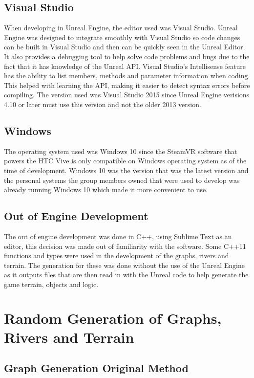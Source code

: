\subsection{Visual Studio}
When developing in Unreal Engine, the editor used was Visual Studio. Unreal Engine was designed to integrate smoothly with Visual Studio so code changes can be built in Visual Studio and then can be quickly seen in the Unreal Editor. It also provides a debugging tool to help solve code problems and bugs due to the fact that it has knowledge of the Unreal API. Visual Studio's Intellisense feature has the ability to list members, methods and parameter information when coding. This helped with learning the API, making it easier to detect syntax errors before compiling. The version used was Visual Studio 2015 since Unreal Engine verisions 4.10 or later must use this version and not the older 2013 version.

\subsection{Windows}
The operating system used was Windows 10 since the SteamVR software that powers the HTC Vive is only compatible on Windows operating system as of the time of development. Windows 10 was the version that was the latest version and the personal systems the group members owned that were used to develop was already running Windows 10 which made it more convenient to use.

\subsection{Out of Engine Development}
The out of engine development was done in C++, using Sublime Text as an editor, this decision was made out of familiarity with the software. Some C++11 functions and types were used in the development of the graphs, rivers and terrain. The generation for these was done without the use of the Unreal Engine as it outputs files that are then read in with the Unreal code to help generate the game terrain, objects and logic.

\section{Random Generation of Graphs, Rivers and Terrain}

\subsection{Graph Generation Original Method}\label{subsec:GGOM}
